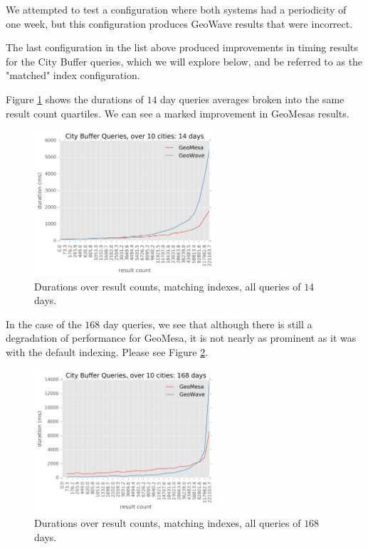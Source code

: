 We attempted to test a configuration where both systems had a periodicity of one week, but this configuration
produces GeoWave results that were incorrect.

The last configuration in the list above produced improvements in timing results for the City Buffer queries, which we will explore below,
and be referred to as the "matched" index configuration.

Figure \ref{matching14} shows the durations of $14$ day queries averages broken into the same result count quartiles.
We can see a marked improvement in GeoMesas results.

\begin{figure}[h!tb]
  \centering
  \includegraphics[width=0.60\textwidth]{../docs/img/gdelt/014-days-matching.png}
  \caption{Durations over result counts, matching indexes, all queries of $14$ days.}
  \label{matching14}
\end{figure}

In the case of the $168$ day queries, we see that although there is still a degradation of performance for GeoMesa,
it is not nearly as prominent as it was with the default indexing.
Please see Figure \ref{matching168}.

\begin{figure}[h!tb]
  \centering
  \includegraphics[width=0.60\textwidth]{../docs/img/gdelt/168-days-matching.png}
  \caption{Durations over result counts, matching indexes, all queries of $168$ days.}
  \label{matching168}
\end{figure}

